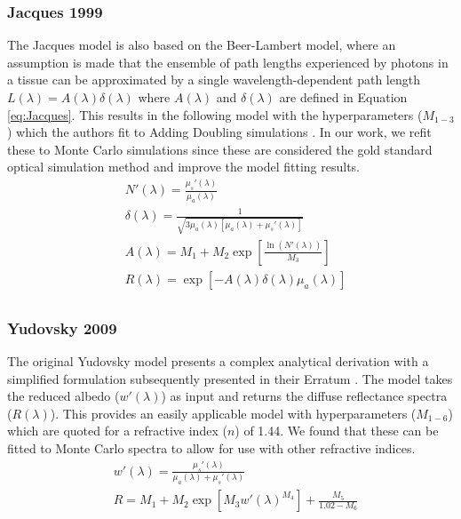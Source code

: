 \subsubsection{Jacques 1999}\label{sec:Jacques}
The Jacques model is also based on the Beer-Lambert model, where an assumption is made that the ensemble of path lengths experienced by photons in a tissue can be approximated by a single wavelength-dependent path length $L(\lambda) = A(\lambda)\delta(\lambda)$ where $A(\lambda)$ and $\delta(\lambda)$ are defined in Equation \ref{eq:Jacques}. This results in the following model with the hyperparameters ($M_{1-3}$) which the authors
fit
to Adding Doubling simulations \cite{Jacques1999}. In our work, we refit these to Monte Carlo simulations since these are considered the gold standard optical simulation method and improve the model fitting results. 
\begin{equation}
\begin{aligned}
    & N'(\lambda) = \frac{\mu_s'(\lambda)}{\mu_a(\lambda)} \\
    & \delta(\lambda) = \frac{1}{\sqrt{3\mu_a(\lambda)[\mu_a(\lambda) + \mu_s'(\lambda)]}} \\
    & A(\lambda) = M_1 + M_2\exp \left[ \frac{\ln(N'(\lambda))}{M_3} \right] \\
    & R(\lambda) = \exp[-A(\lambda)\delta(\lambda)\mu_a(\lambda)] \\
\end{aligned}
\label{eq:Jacques}
\end{equation}

\subsubsection{Yudovsky 2009}\label{sec:Yudovskysingle}
The original Yudovsky model presents a complex analytical derivation \cite{Yudovsky2009} with a simplified formulation subsequently presented in their Erratum \cite{Yudovsky2015}. The model takes the reduced albedo ($w'(\lambda)$) as input and returns the diffuse reflectance spectra ($R(\lambda)$). This provides an easily applicable model with hyperparameters ($M_{1-6}$) which are quoted for a refractive index ($n$) of 1.44. We found that these can be fitted to Monte Carlo spectra to allow for use with other refractive indices. 
\begin{equation}
\begin{aligned}
    & w'(\lambda) = \frac{\mu_s'(\lambda)}{\mu_a(\lambda) + \mu_s'(\lambda)} \\
    & R = M_1 + M_2\exp{\left[ M_3w'(\lambda)^{M_4}\right]} + \frac{M_5}{1.02 - M_6} \\
\end{aligned}
\label{eq:Yudovskysingle}
\end{equation} 

